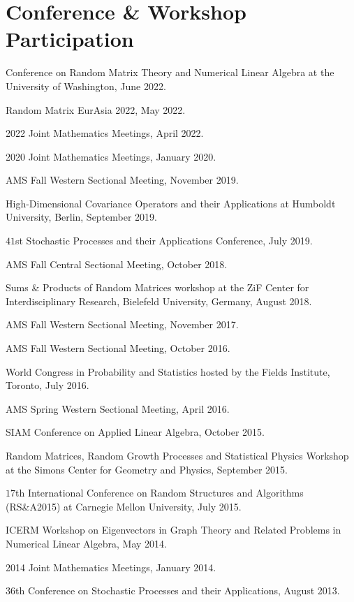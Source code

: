 \documentclass[letterpaper]{article}
\renewenvironment{itemize}{
  \begin{list}{}{
    \setlength{\leftmargin}{1em}
  }
}{
  \end{list}
}
\begin{document}
\section*{Conference \& Workshop Participation}
\begin{itemize}
	\item Conference on Random Matrix Theory and Numerical Linear Algebra at the University of Washington, June 2022.  
	\item Random Matrix EurAsia 2022, May 2022.
	\item 2022 Joint Mathematics Meetings, April 2022.
	\item 2020 Joint Mathematics Meetings, January 2020.  
	\item AMS Fall Western Sectional Meeting, November 2019.  
	\item High-Dimensional Covariance Operators and their Applications at Humboldt University, Berlin, September 2019.  
	\item $41$st Stochastic Processes and their Applications Conference, July 2019.
	\item AMS Fall Central Sectional Meeting, October 2018.  
	\item Sums \& Products of Random Matrices workshop at the ZiF Center for Interdisciplinary Research, Bielefeld University, Germany, August 2018.
	\item AMS Fall Western Sectional Meeting, November 2017.  
	\item AMS Fall Western Sectional Meeting, October 2016.  
	\item World Congress in Probability and Statistics hosted by the Fields Institute, Toronto, July 2016.  
	\item AMS Spring Western Sectional Meeting, April 2016.  
	\item SIAM Conference on Applied Linear Algebra, October 2015.
	\item Random Matrices, Random Growth Processes and Statistical Physics Workshop at the Simons Center for Geometry and Physics, September 2015.
	\item $17$th International Conference on Random Structures and Algorithms (RS\&A2015) at Carnegie Mellon University, July 2015.
	\item ICERM Workshop on Eigenvectors in Graph Theory and Related Problems in Numerical Linear Algebra, May 2014.
	\item 2014 Joint Mathematics Meetings, January 2014.
	\item $36$th Conference on Stochastic Processes and their Applications, August 2013.

\end{itemize}
\end{document}
